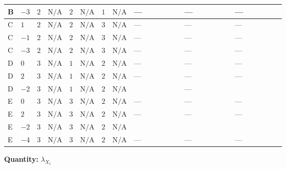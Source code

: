 \documentclass[8pt]{article}
\begin{document}
\begin{landscape}
\begin{longtable}{@{}llcccccc >{\raggedright\arraybackslash}p{0.21\linewidth} >{\raggedright\arraybackslash}p{0.21\linewidth} >{\raggedright\arraybackslash}p{0.21\linewidth}@{}}
\midrule
B & $-3$ & $2$ & $\text{N/A}$ & $2$ & $\text{N/A}$ & $1$ & $\text{N/A}$ & --- & --- & --- \\
\midrule
C & $1$ & $2$ & $\text{N/A}$ & $2$ & $\text{N/A}$ & $3$ & $\text{N/A}$ & --- & --- & --- \\
\midrule
C & $-1$ & $2$ & $\text{N/A}$ & $2$ & $\text{N/A}$ & $3$ & $\text{N/A}$ & --- & --- & --- \\
\midrule
C & $-3$ & $2$ & $\text{N/A}$ & $2$ & $\text{N/A}$ & $3$ & $\text{N/A}$ & --- & --- & --- \\
\midrule
D & $0$ & $3$ & $\text{N/A}$ & $1$ & $\text{N/A}$ & $2$ & $\text{N/A}$ & --- & --- & --- \\
\midrule
D & $2$ & $3$ & $\text{N/A}$ & $1$ & $\text{N/A}$ & $2$ & $\text{N/A}$ & --- & --- & --- \\
\midrule
D & $-2$ & $3$ & $\text{N/A}$ & $1$ & $\text{N/A}$ & $2$ & $\text{N/A}$ & \scriptsize\adjustbox{max width=\linewidth}{$\begin{gathered} +9 {\lambda_{X_{2}}}^2\end{gathered}$} & --- & \scriptsize\adjustbox{max width=\linewidth}{$\begin{gathered} +2 {\lambda_{X_{16}}}^2\end{gathered}$} \\
\midrule
E & $0$ & $3$ & $\text{N/A}$ & $3$ & $\text{N/A}$ & $2$ & $\text{N/A}$ & --- & --- & --- \\
\midrule
E & $2$ & $3$ & $\text{N/A}$ & $3$ & $\text{N/A}$ & $2$ & $\text{N/A}$ & --- & --- & --- \\
\midrule
E & $-2$ & $3$ & $\text{N/A}$ & $3$ & $\text{N/A}$ & $2$ & $\text{N/A}$ & \scriptsize\adjustbox{max width=\linewidth}{$\begin{gathered} +11 {\lambda_{X_{2}}}^2\end{gathered}$} & \scriptsize\adjustbox{max width=\linewidth}{$\begin{gathered} +{\lambda_{X_{7}}^{(2)}}^2\end{gathered}$} & \scriptsize\adjustbox{max width=\linewidth}{$\begin{gathered} +2 {\lambda_{X_{16}}}^2\end{gathered}$} \\
\midrule
E & $-4$ & $3$ & $\text{N/A}$ & $3$ & $\text{N/A}$ & $2$ & $\text{N/A}$ & --- & --- & --- \\
\midrule
\bottomrule
\end{longtable}
\clearpage
\noindent\textbf{Quantity: }${\lambda_{X_{1}}}$\par\smallskip

\end{landscape}
\end{document}
